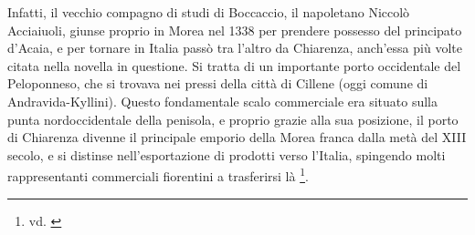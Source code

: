 Infatti, il vecchio compagno di studi di Boccaccio, il napoletano
Niccolò Acciaiuoli, giunse proprio in Morea nel 1338 per prendere
possesso del principato d'Acaia, e per tornare in Italia passò tra
l'altro da Chiarenza, anch'essa più volte citata nella novella in
questione. Si tratta di un importante porto occidentale del Peloponneso,
che si trovava nei pressi della città di Cillene (oggi comune di
Andravida-Kyllini). Questo fondamentale scalo commerciale era situato
sulla punta nordoccidentale della penisola, e proprio grazie alla sua
posizione, il porto di Chiarenza divenne il principale emporio della
Morea franca dalla metà del XIII secolo, e si distinse nell'esportazione
di prodotti verso l'Italia, spingendo molti rappresentanti commerciali
fiorentini a trasferirsi là \footnote{vd.
  \autocite[p.~112]{morosini2010}}.

